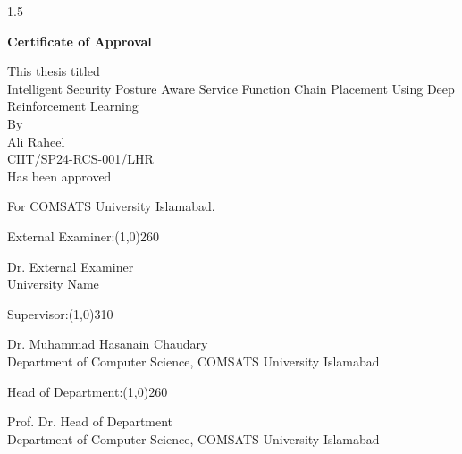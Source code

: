 \newpage
\begin{spacing}{1.5}
\begin{center}
\LARGE{\textbf{{Certificate of Approval}}}\\
\end{center}

\begin{center}
\normalsize {This thesis titled}\\
\LARGE{Intelligent Security Posture Aware Service Function Chain Placement Using
Deep Reinforcement Learning}\\
\normalsize {By\\
Ali Raheel\\

CIIT/SP24-RCS-001/LHR\\

Has been approved}\\

\end{center}

\begin{center}
\normalsize {For COMSATS University Islamabad.}\\
\end{center}

\vspace{0.1in}
\noindent \normalsize {External Examiner:}\line(1,0){260}
\begin{center}
\normalsize {Dr. External Examiner}\\
University Name\\
\end{center}
\vspace{0.1in}
\normalsize {Supervisor:}\line(1,0){310}
\begin{center}
\normalsize {Dr. Muhammad Hasanain Chaudary\\
Department of Computer Science, COMSATS University Islamabad}
\end{center}
\vspace{0.1in}
\normalsize {Head of Department:}\line(1,0){260}
\begin{center}
\normalsize {Prof. Dr. Head of Department\\
Department of Computer Science, COMSATS University Islamabad}
\end{center}
\end{spacing}
